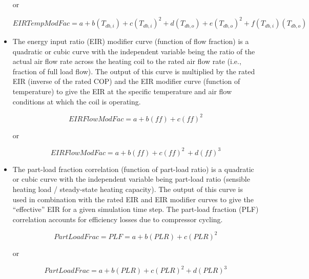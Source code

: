 \begin{itemize}
or

\begin{equation}
EIRTempModFac = a + b\left( {{T_{db,i}}} \right) + c{\left( {{T_{db,i}}} \right)^2} + d\left( {{T_{db,o}}} \right) + e{\left( {{T_{db,o}}} \right)^2} + f\left( {{T_{db,i}}} \right)\left( {{T_{db,o}}} \right)
\end{equation}

  \item
The energy input ratio (EIR) modifier curve (function of flow fraction) is a quadratic or cubic curve with the independent variable being the ratio of the actual air flow rate across the heating coil to the rated air flow rate (i.e., fraction of full load flow). The output of this curve is multiplied by the rated EIR (inverse of the rated COP) and the EIR modifier curve (function of temperature) to give the EIR at the specific temperature and air flow conditions at which the coil is operating.

\begin{equation}
EIRFlowModFac = a + b\left( {ff} \right) + c{\left( {ff} \right)^2}
\end{equation}

or

\begin{equation}
EIRFlowModFac = a + b\left( {ff} \right) + c{\left( {ff} \right)^2}\, + d{\left( {ff} \right)^3}
\end{equation}

  \item
The part-load fraction correlation (function of part-load ratio) is a quadratic or cubic curve with the independent variable being part-load ratio (sensible heating load / steady-state heating capacity). The output of this curve is used in combination with the rated EIR and EIR modifier curves to give the ``effective'' EIR for a given simulation time step. The part-load fraction (PLF) correlation accounts for efficiency losses due to compressor cycling.

\begin{equation}
PartLoadFrac = PLF = a + b\left( {PLR} \right) + c{\left( {PLR} \right)^2}
\label{eq:SSEHPDXHeatAirCoilPartLoadFrac1}
\end{equation}

or

\begin{equation}
PartLoadFrac = a + b\left( {PLR} \right) + c{\left( {PLR} \right)^2} + d{\left( {PLR} \right)^3}
\label{eq:SSEHPDXHeatAirCoilPartLoadFrac2}
\end{equation}


\end{itemize}
